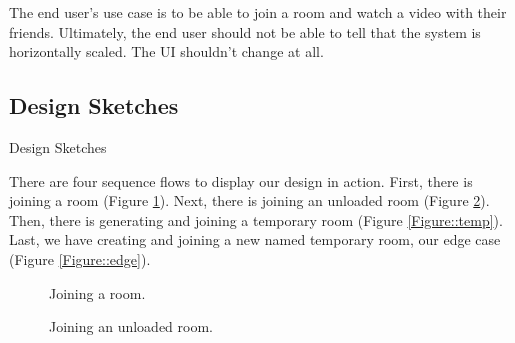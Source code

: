 The end user's use case is to be able to join a room and watch a video with their friends. Ultimately, the end user should not be
able to tell that the system is horizontally scaled. The UI shouldn't change at all.

\subsection{Design Sketches}
Design Sketches

There are four sequence flows to display our design in action. First, there is joining a room (Figure \ref{Figure::room}). Next, there is joining an unloaded room (Figure \ref{Figure::unloaded}). Then, there is generating and joining a temporary room (Figure \ref{Figure::temp}). Last, we have creating and joining a new named temporary room, our edge case (Figure \ref{Figure::edge}).

\begin{figure}
  \centering
  \caption{\label{Figure::room} Joining a room.}
\end{figure}

\begin{figure}
  \centering
  \caption{\label{Figure::unloaded} Joining an unloaded room.}
\end{figure}

